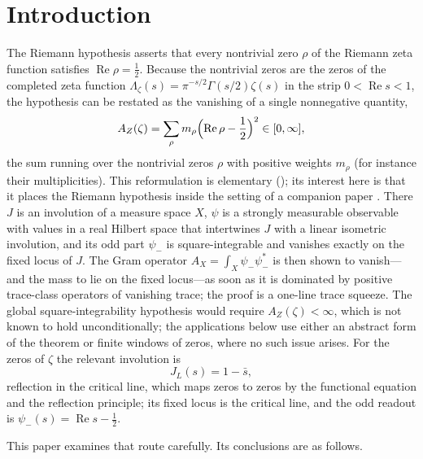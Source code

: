 \documentclass[11pt]{article}
\DeclareMathOperator{\Real}{Re}
\newcommand{\JL}{J_{L}}
\newcommand{\psimRH}{\psi_{-}}
\newcommand{\Lzeta}{\Lambda_{\zeta}}
\newcommand{\AZ}{A_{Z}(\zeta)}
\newcommand{\psim}{\psi_{-}}
\newcommand{\AX}{A_{X}}
\theoremstyle{definition}
\begin{document}
\section{Introduction}
\label{sec:intro}

The Riemann hypothesis \citep{Riemann1859} asserts that every
nontrivial zero \(\rho\) of the Riemann zeta function satisfies
\(\Real\rho=\frac12\).  Because the nontrivial zeros are the zeros of
the completed zeta function
\(\Lzeta(s)=\pi^{-s/2}\Gamma(s/2)\zeta(s)\) in the strip
\(0<\Real s<1\), the hypothesis can be restated as the vanishing of a
single nonnegative quantity,
\[
  \AZ=\sum_{\rho}m_\rho\Bigl(\Real\rho-\frac12\Bigr)^2
  \in[0,\infty],
\]
the sum running over the nontrivial zeros \(\rho\) with positive
weights \(m_\rho\) (for instance their multiplicities).  This
reformulation is elementary (); its
interest here is that it places the Riemann hypothesis inside the
setting of a companion paper \citep{TsiokosSDTC2026}.  There \(J\) is
an involution of a measure space \(X\), \(\psi\) is a strongly
measurable observable with values in a real Hilbert space that
intertwines \(J\) with a linear isometric involution, and its odd part
\(\psim\) is square-integrable and vanishes exactly on the fixed locus
of \(J\).  The Gram operator \(\AX=\int_X\psim\psim^*\) is then shown to
vanish---and the mass to lie on the fixed locus---as soon as it is
dominated by positive trace-class operators of vanishing trace; the
proof is a one-line trace squeeze.  The global square-integrability hypothesis would require \(\AZ<\infty\),
which is not known to hold unconditionally; the
applications below use either an abstract form of the theorem or
finite windows of zeros, where no such issue arises.  For the zeros of \(\zeta\) the relevant
involution is
\[
  \JL(s)=1-\bar s,
\]
reflection in the critical line, which maps zeros to zeros by the
functional equation and the reflection principle; its fixed locus is
the critical line, and the odd readout is \(\psimRH(s)=\Real s-\frac12\).

This paper examines that route carefully.  Its conclusions are as
follows.
\end{document}
